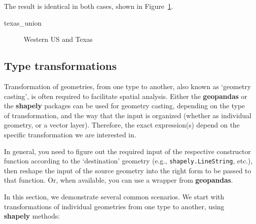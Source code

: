 \documentclass[
  letterpaper,
]{krantz}
\newenvironment{Shaded}{\begin{snugshade}}{\end{snugshade}}
\newcommand{\NormalTok}[1]{\textcolor[rgb]{0.00,0.23,0.31}{#1}}
\begin{document}
The result is identical in both cases, shown in
Figure~\ref{fig-dissolve3}.

\begin{Shaded}
\begin{Highlighting}[]
\NormalTok{texas\_union}
\end{Highlighting}
\end{Shaded}

\begin{figure}[H]


\caption{\label{fig-dissolve3}Western US and Texas}

\end{figure}%

\subsection{Type transformations}\label{sec-type-transformations}

Transformation of geometries, from one type to another, also known as
`geometry casting', is often required to facilitate spatial analysis.
Either the \textbf{geopandas} or the \textbf{shapely} packages can be
used for geometry casting, depending on the type of transformation, and
the way that the input is organized (whether as individual geometry, or
a vector layer). Therefore, the exact expression(s) depend on the
specific transformation we are interested in.

In general, you need to figure out the required input of the respective
constructor function according to the `destination' geometry (e.g.,
\texttt{shapely.LineString}, etc.), then reshape the input of the source
geometry into the right form to be passed to that function. Or, when
available, you can use a wrapper from \textbf{geopandas}.

In this section, we demonstrate several common scenarios. We start with
transformations of individual geometries from one type to another, using
\textbf{shapely} methods:
\end{document}
